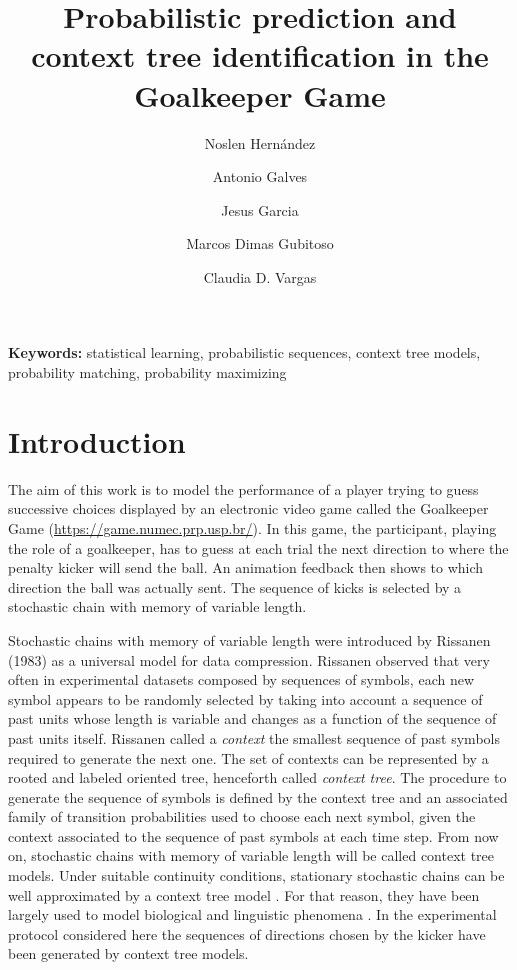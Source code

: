 \documentclass[fleqn,10pt]{wlscirep}
\title{Probabilistic prediction and context tree identification in the Goalkeeper Game}
\author[1]{Noslen Hern\'{a}ndez}
\author[2,*]{Antonio Galves}
\author[3]{Jesus Garcia}
\author[**]{Marcos Dimas Gubitoso}
\author[4]{Claudia D. Vargas}
\affil[1]{Institut National Polytechnique de Toulouse}
\affil[2]{Universidade de S\~ao Paulo}
\affil[3]{Universidade Estadual de Campinas}
\affil[4]{Universidade Federal do Rio de Janeiro}
\affil[*]{galves@usp.br}
\affil[**]{In memoriam}
\providecommand{\mykeywords}[1]{\textbf{Keywords:} #1}
\begin{document}
	\flushbottom
	\maketitle
	\thispagestyle{empty}

\mykeywords{statistical learning, probabilistic sequences, context tree models, probability matching, probability maximizing}

	
\section*{Introduction}
The aim of this work is to model the performance of a player trying to guess successive choices displayed by an electronic video game called the Goalkeeper Game (\url{https://game.numec.prp.usp.br/}). In this game, the participant, playing the role of a goalkeeper, has to guess at each trial the next direction to where the penalty kicker will send the ball. An animation feedback then shows to which direction the ball was actually sent. The sequence of kicks is selected by a stochastic chain with memory of variable length. 

Stochastic chains with memory of variable length were introduced by Rissanen (1983) \cite{Rissanen:83} as a universal model for data compression. Rissanen observed that very often in experimental datasets composed by sequences of symbols, each new symbol appears to be randomly selected by taking into account a sequence of past units whose length is variable and changes as a function of the sequence of past units itself. Rissanen called a \textit{context} the smallest sequence of past symbols required to generate the next one. The set of contexts can be represented by a rooted and labeled oriented tree, henceforth called \textit{context tree}. The procedure to generate the sequence of symbols is defined by the context tree and an associated family of transition probabilities used to choose each next symbol, given the context associated to the sequence of past symbols at each time step. From now on, stochastic chains with memory of variable length will be called context tree models. Under suitable continuity conditions, stationary stochastic chains can be well approximated by a context tree model \cite{Fernandez02}. For that reason, they have been largely used to model biological and linguistic phenomena \cite{Buhlmann-Wyner:99,csiszar_context_2006,Leonardi06, GarivierLeonardi11,galves:12,Galves-Loch:13,BelloniOliveira17,duarte_retrieving_2019,Hernandez2021}. In the experimental protocol considered here the sequences of directions chosen by the kicker have been generated by context tree models.  
\end{document}
